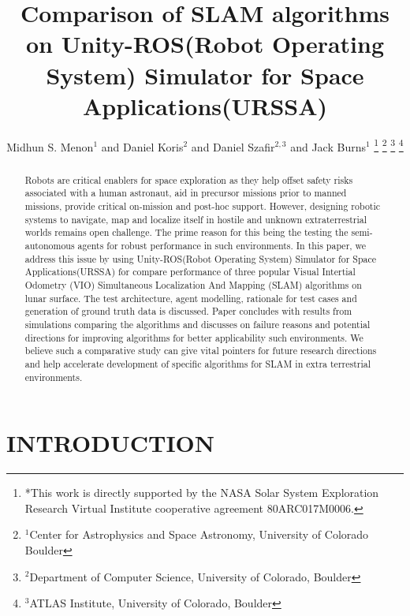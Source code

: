 \documentclass[a4paper, 10pt, conference]{ieeeconf}      %
\title{\LARGE \bf
Comparison of SLAM algorithms on Unity-ROS(Robot Operating System) Simulator for Space Applications(URSSA)
}
\author{Midhun S. Menon$^{1}$ and Daniel Koris$^{2}$ and Daniel Szafir$^{2,3}$ and Jack Burns$^{1}$%
\thanks{*This work is directly supported by the NASA Solar System Exploration Research Virtual Institute cooperative agreement 80ARC017M0006.}%
\thanks{$^{1}$Center for Astrophysics and Space Astronomy, University of Colorado Boulder}%
\thanks{$^{2}$Department of Computer Science, University of Colorado, Boulder}%
\thanks{$^{3}$ATLAS Institute, University of Colorado, Boulder}%
}
\begin{document}
\maketitle
\thispagestyle{empty}
\pagestyle{empty}


\begin{abstract}
Robots are critical enablers for space exploration as they help offset safety risks associated with a human astronaut, aid in precursor missions prior to manned missions, provide critical on-mission and post-hoc support. However, designing robotic systems to navigate, map and localize itself in hostile and unknown extraterrestrial worlds remains open challenge. The prime reason for this being the testing the semi-autonomous agents  for robust performance in such environments. In this paper, we address this issue by using Unity-ROS(Robot Operating System) Simulator for Space Applications(URSSA) for compare performance of three popular Visual Intertial Odometry (VIO) Simultaneous Localization And Mapping (SLAM) algorithms on lunar surface. The test architecture, agent modelling, rationale for test cases and generation of ground truth data is discussed. Paper concludes with results from simulations comparing the algorithms and discusses on failure reasons and potential directions for improving algorithms for better applicability such environments. We believe such a comparative study can give vital pointers for future research directions and help accelerate development of specific algorithms for SLAM in extra terrestrial environments.

\end{abstract}


\section{INTRODUCTION}
\end{document}
